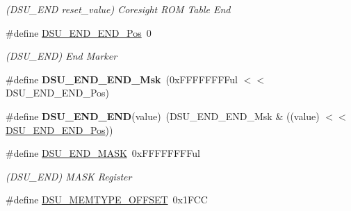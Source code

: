 \begin{DoxyCompactItemize}
\begin{DoxyCompactList}\small\item\em (D\+S\+U\+\_\+\+E\+N\+D reset\+\_\+value) Coresight R\+O\+M Table End \end{DoxyCompactList}\item 
\hypertarget{group___s_a_m_l21___d_s_u_ga490d2f02762f42681fc4dcaa0db570bb}{}\#define \hyperlink{group___s_a_m_l21___d_s_u_ga490d2f02762f42681fc4dcaa0db570bb}{D\+S\+U\+\_\+\+E\+N\+D\+\_\+\+E\+N\+D\+\_\+\+Pos}~0\label{group___s_a_m_l21___d_s_u_ga490d2f02762f42681fc4dcaa0db570bb}

\begin{DoxyCompactList}\small\item\em (D\+S\+U\+\_\+\+E\+N\+D) End Marker \end{DoxyCompactList}\item 
\hypertarget{group___s_a_m_l21___d_s_u_gaaf87e985a2898109e146e505e1bc603e}{}\#define {\bfseries D\+S\+U\+\_\+\+E\+N\+D\+\_\+\+E\+N\+D\+\_\+\+Msk}~(0x\+F\+F\+F\+F\+F\+F\+F\+Ful $<$$<$ D\+S\+U\+\_\+\+E\+N\+D\+\_\+\+E\+N\+D\+\_\+\+Pos)\label{group___s_a_m_l21___d_s_u_gaaf87e985a2898109e146e505e1bc603e}

\item 
\hypertarget{group___s_a_m_l21___d_s_u_ga7f75f47734b0964eae647d11b91f7748}{}\#define {\bfseries D\+S\+U\+\_\+\+E\+N\+D\+\_\+\+E\+N\+D}(value)~(D\+S\+U\+\_\+\+E\+N\+D\+\_\+\+E\+N\+D\+\_\+\+Msk \& ((value) $<$$<$ \hyperlink{group___s_a_m_l21___d_s_u_ga490d2f02762f42681fc4dcaa0db570bb}{D\+S\+U\+\_\+\+E\+N\+D\+\_\+\+E\+N\+D\+\_\+\+Pos}))\label{group___s_a_m_l21___d_s_u_ga7f75f47734b0964eae647d11b91f7748}

\item 
\hypertarget{group___s_a_m_l21___d_s_u_gac1fdb41335952f536cc506c75a0f2e5f}{}\#define \hyperlink{group___s_a_m_l21___d_s_u_gac1fdb41335952f536cc506c75a0f2e5f}{D\+S\+U\+\_\+\+E\+N\+D\+\_\+\+M\+A\+S\+K}~0x\+F\+F\+F\+F\+F\+F\+F\+Ful\label{group___s_a_m_l21___d_s_u_gac1fdb41335952f536cc506c75a0f2e5f}

\begin{DoxyCompactList}\small\item\em (D\+S\+U\+\_\+\+E\+N\+D) M\+A\+S\+K Register \end{DoxyCompactList}\item 
\hypertarget{group___s_a_m_l21___d_s_u_ga9cfb1a386c96d79aa14d0556e89a9847}{}\#define \hyperlink{group___s_a_m_l21___d_s_u_ga9cfb1a386c96d79aa14d0556e89a9847}{D\+S\+U\+\_\+\+M\+E\+M\+T\+Y\+P\+E\+\_\+\+O\+F\+F\+S\+E\+T}~0x1\+F\+C\+C\label{group___s_a_m_l21___d_s_u_ga9cfb1a386c96d79aa14d0556e89a9847}


\end{DoxyCompactItemize}
